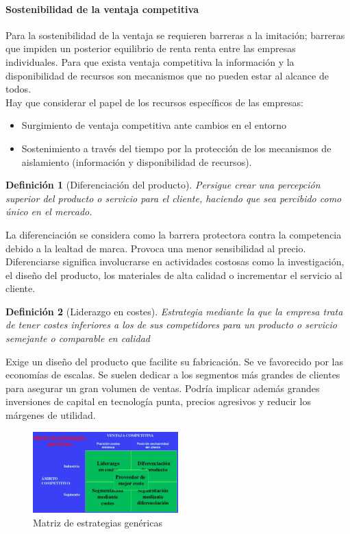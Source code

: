 \documentclass[12pt]{article}
\theoremstyle{definition_wo_parentheses}
\newtheorem{definicion}{Definición}[section]
\begin{document}
\paragraph{Sostenibilidad de la ventaja competitiva} Para la sostenibilidad de la ventaja se requieren barreras a la imitación; barreras que impiden un posterior equilibrio de renta renta entre las empresas individuales. Para que exista ventaja competitiva la información y la disponibilidad de recursos son mecanismos que no pueden estar al alcance de todos. \\

Hay que considerar el papel de los recursos específicos de las empresas: 
\begin{itemize}
\item Surgimiento de ventaja competitiva ante cambios en el entorno
\item Sostenimiento a través del tiempo por la protección de los mecanismos de aislamiento (información y disponibilidad de recursos).
\end{itemize}

\begin{definicion}[Diferenciación del producto]
Persigue crear una percepción superior del producto o servicio para el cliente, haciendo que sea percibido como único en el mercado.
\end{definicion}

La diferenciación se considera como la barrera protectora contra la competencia debido a la lealtad de marca. Provoca una menor sensibilidad al precio. Diferenciarse significa involucrarse en actividades costosas como la investigación, el diseño del producto, los materiales de alta calidad o incrementar el servicio al cliente.

\begin{definicion}[Liderazgo en costes] 
	Estrategia mediante la que la empresa trata de tener costes inferiores a los de sus competidores para un producto o servicio semejante o comparable en calidad
\end{definicion}

Exige un diseño del producto que facilite su fabricación. Se ve favorecido por las economías de escalas. Se suelen dedicar a los segmentos más grandes de clientes para asegurar un gran volumen de ventas. Podría implicar además grandes inversiones de capital en tecnología punta, precios agresivos y reducir los márgenes de utilidad.

\begin{figure}[H]
 \centering
 \includegraphics[width=0.5\textwidth]{matrizEstGenericas}
 \caption{Matriz de estrategias genéricas}
\end{figure}
\end{document}
